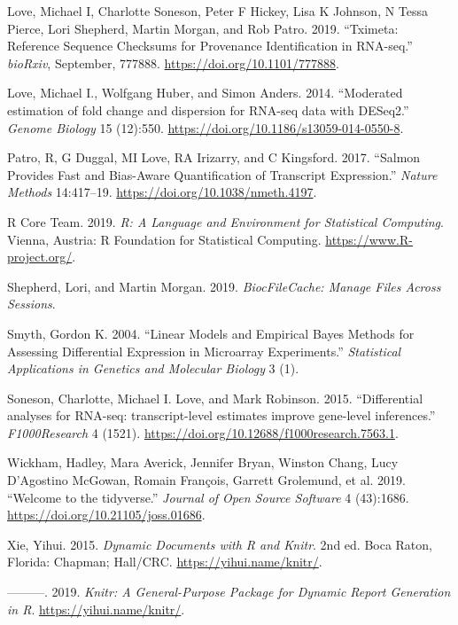 \documentclass[
]{article}
\begin{document}
\leavevmode\hypertarget{ref-Love2019-tximeta}{}%
Love, Michael I, Charlotte Soneson, Peter F Hickey, Lisa K Johnson, N Tessa Pierce, Lori Shepherd, Martin Morgan, and Rob Patro. 2019. ``Tximeta: Reference Sequence Checksums for Provenance Identification in RNA-seq.'' \emph{bioRxiv}, September, 777888. \url{https://doi.org/10.1101/777888}.

\leavevmode\hypertarget{ref-Love2014}{}%
Love, Michael I., Wolfgang Huber, and Simon Anders. 2014. ``Moderated estimation of fold change and dispersion for RNA-seq data with DESeq2.'' \emph{Genome Biology} 15 (12):550. \url{https://doi.org/10.1186/s13059-014-0550-8}.

\leavevmode\hypertarget{ref-salmon}{}%
Patro, R, G Duggal, MI Love, RA Irizarry, and C Kingsford. 2017. ``Salmon Provides Fast and Bias-Aware Quantification of Transcript Expression.'' \emph{Nature Methods} 14:417--19. \url{https://doi.org/10.1038/nmeth.4197}.

\leavevmode\hypertarget{ref-baser}{}%
R Core Team. 2019. \emph{R: A Language and Environment for Statistical Computing}. Vienna, Austria: R Foundation for Statistical Computing. \url{https://www.R-project.org/}.

\leavevmode\hypertarget{ref-bcfilecache}{}%
Shepherd, Lori, and Martin Morgan. 2019. \emph{BiocFileCache: Manage Files Across Sessions}.

\leavevmode\hypertarget{ref-Smyth2004}{}%
Smyth, Gordon K. 2004. ``Linear Models and Empirical Bayes Methods for Assessing Differential Expression in Microarray Experiments.'' \emph{Statistical Applications in Genetics and Molecular Biology} 3 (1).

\leavevmode\hypertarget{ref-Soneson2015}{}%
Soneson, Charlotte, Michael I. Love, and Mark Robinson. 2015. ``Differential analyses for RNA-seq: transcript-level estimates improve gene-level inferences.'' \emph{F1000Research} 4 (1521). \url{https://doi.org/10.12688/f1000research.7563.1}.

\leavevmode\hypertarget{ref-tidyverse}{}%
Wickham, Hadley, Mara Averick, Jennifer Bryan, Winston Chang, Lucy D'Agostino McGowan, Romain François, Garrett Grolemund, et al. 2019. ``Welcome to the tidyverse.'' \emph{Journal of Open Source Software} 4 (43):1686. \url{https://doi.org/10.21105/joss.01686}.

\leavevmode\hypertarget{ref-xie2015}{}%
Xie, Yihui. 2015. \emph{Dynamic Documents with R and Knitr}. 2nd ed. Boca Raton, Florida: Chapman; Hall/CRC. \url{https://yihui.name/knitr/}.

\leavevmode\hypertarget{ref-knitr}{}%
---------. 2019. \emph{Knitr: A General-Purpose Package for Dynamic Report Generation in R}. \url{https://yihui.name/knitr/}.
\end{document}
